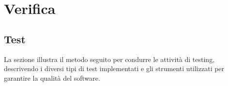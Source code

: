 \section{Verifica}
\subsection{Test}
La sezione illustra il metodo seguito per condurre le attività di testing, descrivendo i diversi tipi di test implementati e gli strumenti utilizzati per garantire la qualità del software.